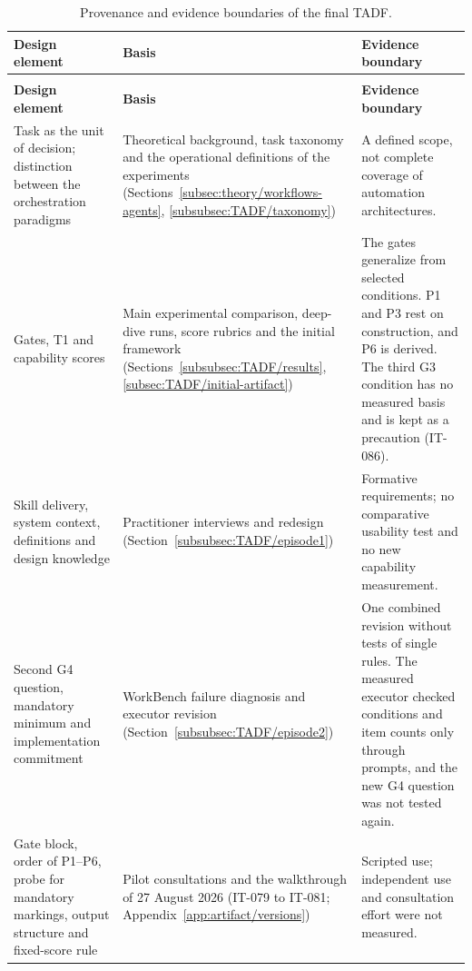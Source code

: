\begingroup
\renewcommand{\baselinestretch}{1}\small
\setlength{\tabcolsep}{3pt}\renewcommand{\arraystretch}{1.08}
\begin{longtable}{>{\raggedright\arraybackslash}p{} >{\raggedright\arraybackslash}p{} >{\raggedright\arraybackslash}p{}}
\caption[Provenance and evidence boundaries of the final TADF]{Provenance and evidence boundaries of the final TADF.}\label{tab:provenance}\\
\toprule
\textbf{Design element} & \textbf{Basis} & \textbf{Evidence boundary}\\
\midrule
\endfirsthead
\multicolumn{3}{l}{\tablename~\thetable{} (continued)}\\
\toprule
\textbf{Design element} & \textbf{Basis} & \textbf{Evidence boundary}\\
\midrule
\endhead
\bottomrule
\endlastfoot
Task as the unit of decision; distinction between the orchestration paradigms & Theoretical background, task taxonomy and the operational definitions of the experiments (Sections~\ref{subsec:theory/workflows-agents}, \ref{subsubsec:TADF/taxonomy}) & A defined scope, not complete coverage of automation architectures. \\
\addlinespace
Gates, T1 and capability scores & Main experimental comparison, deep-dive runs, score rubrics and the initial framework (Sections~\ref{subsubsec:TADF/results}, \ref{subsec:TADF/initial-artifact}) & The gates generalize from selected conditions. P1 and P3 rest on construction, and P6 is derived. The third G3 condition has no measured basis and is kept as a precaution (IT-086). \\
\addlinespace
Skill delivery, system context, definitions and design knowledge & Practitioner interviews and redesign (Section~\ref{subsubsec:TADF/episode1}) & Formative requirements; no comparative usability test and no new capability measurement. \\
\addlinespace
Second G4 question, mandatory minimum and implementation commitment & WorkBench failure diagnosis and executor revision (Section~\ref{subsubsec:TADF/episode2}) & One combined revision without tests of single rules. The measured executor checked conditions and item counts only through prompts, and the new G4 question was not tested again. \\
\addlinespace
Gate block, order of P1--P6, probe for mandatory markings, output structure and fixed-score rule & Pilot consultations and the walkthrough of 27 August 2026 (IT-079 to IT-081; Appendix~\ref{app:artifact/versions}) & Scripted use; independent use and consultation effort were not measured. \\

\end{longtable}
